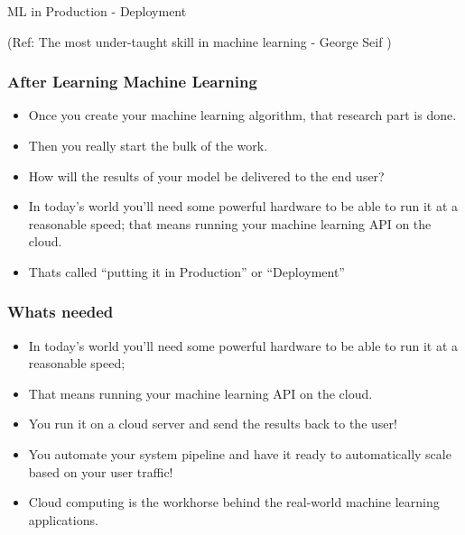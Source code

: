 \begin{frame}[fragile]\frametitle{}
\begin{center}
{\Large ML in Production - Deployment}


{\tiny (Ref: The most under-taught skill in machine learning - George Seif )}
\end{center}


\end{frame}

\begin{frame}\frametitle{After Learning Machine Learning}

\begin{itemize}
\item Once you create your machine learning algorithm, that research part is done. 
\item Then you really start the bulk of the work. 
\item How will the results of your model be delivered to the end user?
\item In today’s world you’ll need some powerful hardware to be able to run it at a reasonable speed; that means running your machine learning API on the cloud.
\item Thats called ``putting it in Production'' or ``Deployment''
\end{itemize}
\end{frame}

\begin{frame}\frametitle{Whats needed}

\begin{itemize}
\item In today’s world you'll need some powerful hardware to be able to run it at a reasonable speed; 
\item That means running your machine learning API on the cloud.
\item You run it on a cloud server and send the results back to the user! 
\item You automate your system pipeline and have it ready to automatically scale based on your user traffic!
\item Cloud computing is the workhorse behind the real-world machine learning applications.
\end{itemize}
\end{frame}

